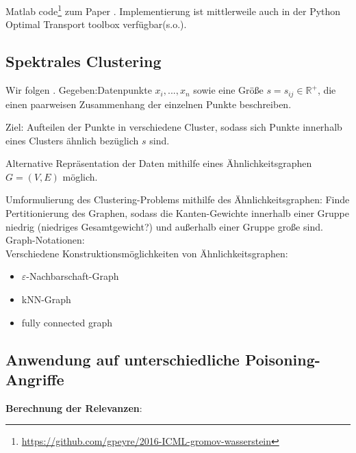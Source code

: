 \documentclass[twoside, 12pt,a4paper]{article}
\numberwithin{equation}{section}
\begin{document}
	Matlab code\footnote{\url{https://github.com/gpeyre/2016-ICML-gromov-wasserstein}} zum Paper \cite{gwd_averaging_kernels}.
	Implementierung ist mittlerweile auch in der Python Optimal Transport toolbox verfügbar(s.o.).
	
	\subsection{Spektrales Clustering}
	Wir folgen \cite{spectralClustering_tut}.
	Gegeben:Datenpunkte $x_i, ..., x_n$ sowie eine Größe $s = s_{ij} \in \mathbb{R}^{+}$, die einen paarweisen Zusammenhang der einzelnen Punkte beschreiben.
	
	Ziel: Aufteilen der Punkte in verschiedene Cluster, sodass sich Punkte innerhalb eines Clusters ähnlich bezüglich $s$ sind.
	
	Alternative Repräsentation der Daten mithilfe eines Ähnlichkeitsgraphen $G=(V,E)$ möglich.
	
	Umformulierung des Clustering-Problems mithilfe des Ähnlichkeitsgraphen: Finde Pertitionierung des Graphen, sodass die Kanten-Gewichte innerhalb einer Gruppe niedrig (niedriges Gesamtgewicht?) und außerhalb einer Gruppe große sind.\\
	
	
	Graph-Notationen:\\
	
	Verschiedene Konstruktionsmöglichkeiten von Ähnlichkeitsgraphen:
	
	\begin{itemize}
		\item $\varepsilon$-Nachbarschaft-Graph\\
		\item kNN-Graph\\
		\item fully connected graph
	\end{itemize}
	\subsection{Anwendung auf unterschiedliche Poisoning-Angriffe} \label{chapter_results} \label{chapter_experiments}
	\noindent \textbf{Berechnung der Relevanzen}:\\
	
\end{document}

